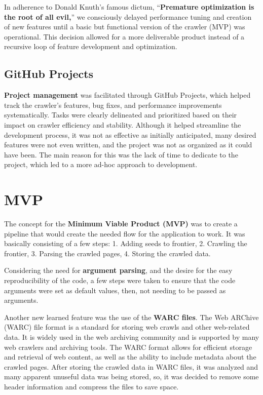 In adherence to Donald Knuth's famous dictum, ``\textbf{Premature optimization is the root of all evil,}'' we consciously delayed performance tuning and creation of new features until a basic but functional version of the crawler (MVP) was operational. This decision allowed for a more deliverable product instead of a recursive loop of feature development and optimization.

\subsection{GitHub Projects}

\textbf{Project management} was facilitated through GitHub Projects, which helped track the crawler's features, bug fixes, and performance improvements systematically. Tasks were clearly delineated and prioritized based on their impact on crawler efficiency and stability. Although it helped streamline the development process, it was not as effective as initially anticipated, many desired features were not even written, and the project was not as organized as it could have been. The main reason for this was the lack of time to dedicate to the project, which led to a more ad-hoc approach to development.

\section{MVP}

The concept for the \textbf{Minimum Viable Product (MVP)} was to create a pipeline that would create the needed flow for the application to work. It was basically consisting of a few steps: 1. Adding seeds to frontier, 2. Crawling the frontier, 3. Parsing the crawled pages, 4. Storing the crawled data.

Considering the need for \textbf{argument parsing}, and the desire for the easy reproducibility of the code, a few steps were taken to ensure that the code arguments were set as default values, then, not needing to be passed as arguments.

Another new learned feature was the use of the \textbf{WARC files}. The Web ARChive (WARC) file format is a standard for storing web crawls and other web-related data. It is widely used in the web archiving community and is supported by many web crawlers and archiving tools. The WARC format allows for efficient storage and retrieval of web content, as well as the ability to include metadata about the crawled pages. After storing the crawled data in WARC files, it was analyzed and many apparent unuseful data was being stored, so, it was decided to remove some header information and compress the files to save space.

